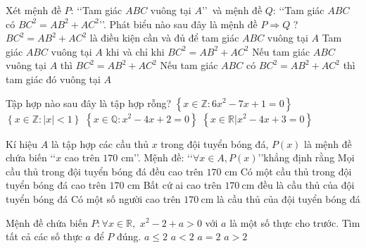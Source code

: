 \begin{ex}%
Xét mệnh đề $P$: \lq\lq  Tam giác $A B C$ vuông tại $A$\rq\rq ~và mệnh đề $Q$: \lq\lq  Tam giác $A B C$ có $B C^2=A B^2+A C^2$\rq\rq. Phát biểu nào sau đây là mệnh đề $P \Rightarrow Q$ ?
\choice
{$B C^2=A B^2+A C^2$ là điều kiện cần và đủ để tam giác $A B C$ vuông tại $A$}
{Tam giác $A B C$ vuông tại $A$ khi và chỉ khi $B C^2=A B^2+A C^2$}
{\True Nếu tam giác $A B C$ vuông tại $A$ thì $B C^2=A B^2+A C^2$}
{Nếu tam giác $A B C$ có $B C^2=A B^2+A C^2$ thì tam giác đó vuông tại $A$}
\end{ex}

\begin{ex}%
Tập hợp nào sau đây là tập hợp rỗng?
\choice
{ $\left\{ x\in \mathbb{Z}: 6x^2-7x+1=0 \right\}$}
{ $\left\{ x\in \mathbb{Z}: | x |<1  \right\}$}
{ \True $\left\{ x\in \mathbb{Q}: x^2-4x+2=0  \right\}$}
{ $\left\{ x\in \mathbb{R}\big| x^2-4x+3=0  \right\}$}
\end{ex}

\begin{ex}%
Kí hiệu $A$ là tập hợp các cầu thủ $x$ trong đội tuyển bóng đá, $P(x)$ là mệnh đề chứa biến \lq\lq $x$ cao trên $170$ cm\rq\rq. Mệnh đề: \lq\lq $\forall x\in A, P(x)$\rq\rq\quad khẳng định rằng
\choice
{\True Mọi cầu thủ trong đội tuyển bóng đá đều cao trên $170$ cm}
{Có một cầu thủ trong đội tuyển bóng đá cao trên $170$ cm}
{Bất cứ ai cao trên $170\mathrm{~cm}$ đều là cầu thủ của đội tuyển bóng đá}
{Có một số người cao trên $170\mathrm{~cm}$ là cầu thủ của đội tuyển bóng đá}
\end{ex}

\begin{ex}%
Mệnh đề chứa biến  $P:\forall x \in \mathbb{R},\,\,{x^2} - 2 + a > 0$ với $ a $ là một số thực cho trước. Tìm tất cả các số thực $ a $  để  $ P $ đúng.
\choice
{ $a \le 2$ }
{$a < 2$  }
{ $a = 2$ }
{\True $a > 2$ }
\end{ex}

